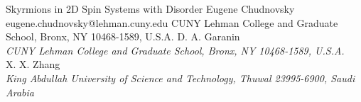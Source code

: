 \begin{conf-abstract}[]
{Skyrmions in 2D Spin Systems with Disorder}
{\color{blue} Eugene Chudnovsky}
{eugene.chudnovsky@lehman.cuny.edu}
{CUNY Lehman College and Graduate School, Bronx, NY 10468-1589, U.S.A.}
{{\color{blue}D. A. Garanin}\\ \textit{CUNY Lehman College and Graduate School, Bronx, NY 10468-1589, U.S.A.}\\ 
{\color{blue}X. X. Zhang}\\ \textit{ King Abdullah University of Science and Technology, Thuwal 23995-6900, Saudi Arabia}\\ 
\decofourleft \decofourright}





\printbibliography[heading=none]

\end{conf-abstract}
